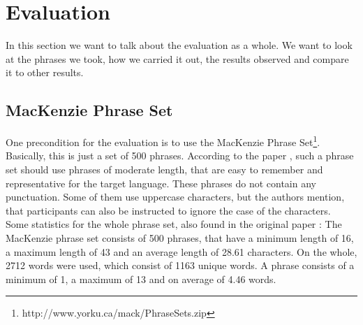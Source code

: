 \chapter{Evaluation}

In this section we want to talk about the evaluation as a whole. We want to look at the phrases we took, how we carried it out, the results observed and compare it to other results.

\section{MacKenzie Phrase Set}
One precondition for the evaluation is to use the MacKenzie Phrase Set\footnote{http://www.yorku.ca/mack/PhraseSets.zip}. Basically, this is just a set of 500 phrases. According to the paper \cite{10.1145/765891.765971}, such a phrase set should use phrases of moderate length, that are easy to remember and representative for the target language. These phrases do not contain any punctuation. Some of them use uppercase characters, but the authors mention, that participants can also be instructed to ignore the case of the characters. 
\\
Some statistics for the whole phrase set, also found in the original paper \cite{10.1145/765891.765971}: The MacKenzie phrase set consists of 500 phrases, that have a minimum length of 16, a maximum length of 43 and an average length of 28.61 characters. On the whole, 2712 words were used, which consist of 1163 unique words. A phrase consists of a minimum of 1, a maximum of 13 and on average of 4.46 words.

